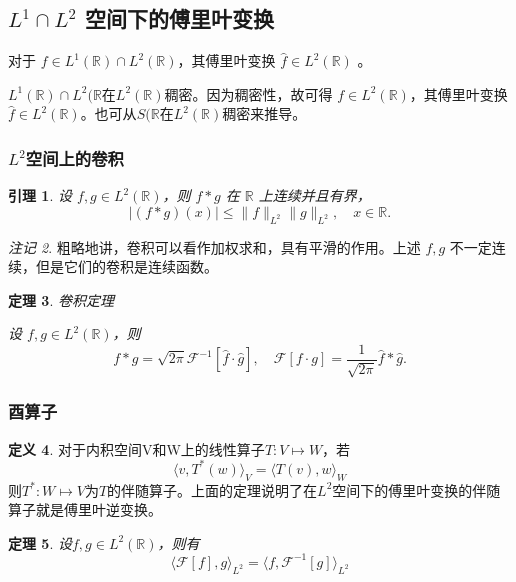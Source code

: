 \documentclass[12pt,a4paper]{article}
\theoremstyle{plain}
\newtheorem{theorem}{定理}[section]
\newtheorem{lemma}[theorem]{引理}
\theoremstyle{definition}
\newtheorem{definition}[theorem]{定义}
\theoremstyle{remark}
\newtheorem{remark}[theorem]{注记}
\begin{document}
\subsection{$L^1 \cap L^2$ 空间下的傅里叶变换}
对于 $f \in L^1(\mathbb{R}) \cap L^2(\mathbb{R})$，其傅里叶变换 $\hat{f} \in L^2(\mathbb{R})$ 。

$L^1(\mathbb{R}) \cap L^2(\mathbb{R}$在$L^2(\mathbb{R})$稠密。因为稠密性，故可得 $f \in L^2(\mathbb{R})$，其傅里叶变换 $\hat{f} \in L^2(\mathbb{R})$。也可从$S(\mathbb{R}$在$L^2(\mathbb{R})$稠密来推导。

\subsubsection{$L^2$空间上的卷积}
\begin{lemma}
	设 \( f, g \in L^2(\mathbb{R}) \)，则 \( f * g \) 在 \(\mathbb{R}\) 上连续并且有界，
	\[
	|(f * g)(x)| \leq \| f \|_{L^2} \| g \|_{L^2}, \quad x \in \mathbb{R}.
	\]
\end{lemma}

\begin{remark}
	粗略地讲，卷积可以看作加权求和，具有平滑的作用。上述 \( f, g \) 不一定连续，但是它们的卷积是连续函数。
\end{remark}

\begin{theorem}卷积定理
	
	设 \( f, g \in L^2(\mathbb{R}) \)，则
	\[
	f * g = \sqrt{2\pi} \mathcal{F}^{-1}[\hat{f} \cdot \hat{g}], \quad \mathcal{F}[f \cdot g] = \frac{1}{\sqrt{2\pi}} \hat{f} * \hat{g}.
	\]
\end{theorem}


\subsubsection{酉算子}


\begin{definition}
	对于内积空间V和W上的线性算子\( T: V \mapsto W \)，若
	\[
	\langle v, T^*(w) \rangle_V = \langle T(v), w \rangle_W
	\]
	则\( T^*: W \mapsto V \)为\( T \)的伴随算子。上面的定理说明了在$L^2$空间下的傅里叶变换的伴随算子就是傅里叶逆变换。
\end{definition}

\begin{theorem}
	设\( f, g \in L^2(\mathbb{R}) \)，则有
	\[
	\langle \mathcal{F}[f], g \rangle_{L^2} = \langle f, \mathcal{F}^{-1}[g] \rangle_{L^2}
	\]
\end{theorem}
\end{document}
